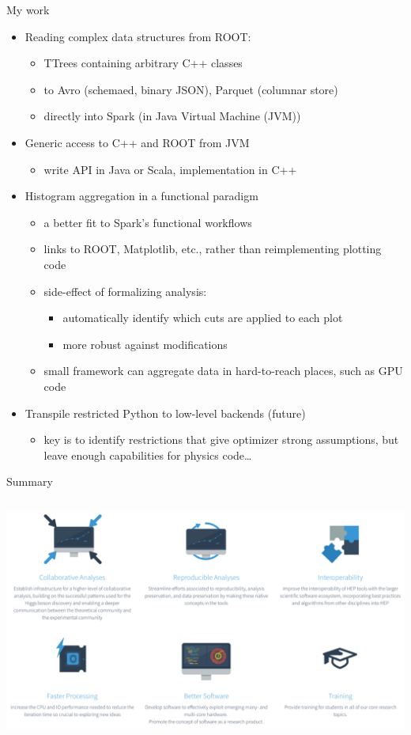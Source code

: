 \documentclass{beamer}
\begin{document}
\begin{frame}{My work}
\vspace{0.25 cm}
\begin{itemize}
\item<1-> Reading complex data structures from ROOT:
\begin{itemize}
\item TTrees containing arbitrary C++ classes
\item to Avro (schemaed, binary JSON), Parquet (columnar store)
\item directly into Spark (in Java Virtual Machine (JVM))
\end{itemize}

\item<2-> Generic access to C++ and ROOT from JVM
\begin{itemize}
\item write API in Java or Scala, implementation in C++
\end{itemize}

\item<3-> Histogram aggregation in a functional paradigm
\begin{itemize}
\item a better fit to Spark's functional workflows
\item links to ROOT, Matplotlib, etc., rather than reimplementing plotting code
\item side-effect of formalizing analysis:
\begin{itemize}
\item automatically identify which cuts are applied to each plot
\item more robust against modifications
\end{itemize}
\item small framework can aggregate data in hard-to-reach places, such as GPU code
\end{itemize}

\item<4-> Transpile restricted Python to low-level backends (future)
\begin{itemize}
\item key is to identify restrictions that give optimizer strong assumptions, but leave enough capabilities for physics code\ldots
\end{itemize}
\end{itemize}
\end{frame}

\begin{frame}{Summary}
\vspace{0.5 cm}
\begin{columns}
\includegraphics[width=\linewidth]{diana_goals.png}
\end{columns}
\end{frame}
\end{document}
